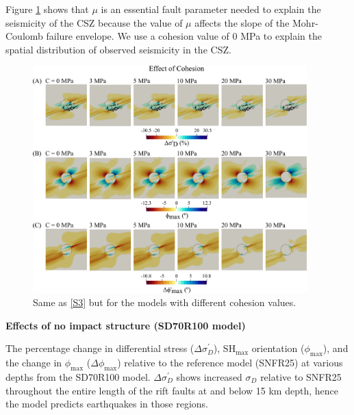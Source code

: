 \documentclass[draft,jgrga]{agutexSI2019}
\begin{document}
\begin{article}
Figure \ref{S4} shows that $\mu$ is an essential fault parameter needed to explain the seismicity of the CSZ because the value of $\mu$ affects the slope of the Mohr-Coulomb failure envelope. We use a cohesion value of 0 MPa to explain the spatial distribution of observed seismicity in the CSZ. 

\vspace{10mm} %

\begin{figure}
\includegraphics[width=25pc]{Figures/SD70R25C_S2.png}
\caption{Same as \ref{S3} but for the models with different cohesion values.}
\label{S4}
\end{figure}

\vspace{10mm} %

\noindent\textbf{Effects of no impact structure (SD70R100 model)}

The percentage change in differential stress ($\Delta\sigma_{D}^{\prime}$), SH$_{\max}$ orientation ($\phi_{\max}$), and the change in $\phi_{\max}$ ($\Delta\phi_{\max}$) relative to the reference model (SNFR25) at various depths from the SD70R100 model.  $\Delta\sigma_{D}^{\prime}$ shows increased $\sigma_{D}$ relative to SNFR25 throughout the entire length of the rift faults at and below 15 km depth, hence the model predicts earthquakes in those regions. 

\vspace{10mm} %


\end{article}
\end{document}
